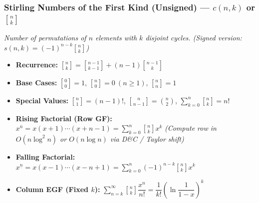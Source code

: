 \subsubsection*{Stirling Numbers of the First Kind (Unsigned) --- $c(n, k)$ or $\genfrac{[}{]}{0pt}{}{n}{k}$}
\textit{Number of permutations of $n$ elements with $k$ disjoint cycles. (Signed version: $s(n, k) = (-1)^{n - k} \genfrac{[}{]}{0pt}{}{n}{k}$)}
\begin{itemize}
    \item \textbf{Recurrence:} $\genfrac{[}{]}{0pt}{}{n}{k} = \genfrac{[}{]}{0pt}{}{n - 1}{k - 1} + (n - 1) \genfrac{[}{]}{0pt}{}{n - 1}{k}$
    \item \textbf{Base Cases:} $\genfrac{[}{]}{0pt}{}{0}{0} = 1$, $\genfrac{[}{]}{0pt}{}{n}{0} = 0 \ (n \ge 1)$, $\genfrac{[}{]}{0pt}{}{n}{n} = 1$
    \item \textbf{Special Values:} $\genfrac{[}{]}{0pt}{}{n}{1} = (n - 1)!$, \quad $\genfrac{[}{]}{0pt}{}{n}{n - 1} = \binom{n}{2}$, \quad $\sum_{k = 0}^{n} \genfrac{[}{]}{0pt}{}{n}{k} = n!$
    \item \textbf{Rising Factorial (Row GF):} $x^{\overline{n}} = x(x + 1)\cdots(x + n - 1) = \sum_{k = 0}^{n} \genfrac{[}{]}{0pt}{}{n}{k} x^k$ \quad \textit{(Compute row in $O(n \log^2 n)$ or $O(n \log n)$ via D\&C / Taylor shift)}
    \item \textbf{Falling Factorial:} $x^{\underline{n}} = x(x - 1)\cdots(x - n + 1) = \sum_{k = 0}^{n} (-1)^{n - k} \genfrac{[}{]}{0pt}{}{n}{k} x^k$
    \item \textbf{Column EGF (Fixed $k$):} $\sum_{n = k}^{\infty} \genfrac{[}{]}{0pt}{}{n}{k} \dfrac{x^n}{n!} = \dfrac{1}{k!} \left( \ln \dfrac{1}{1 - x} \right)^k$
\end{itemize}

